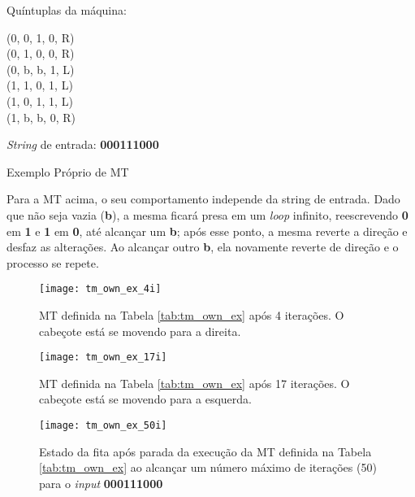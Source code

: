 \begin{table}[H]
    \begin{minipage}{0.6\linewidth}

        \begin{minipage}{0.55\linewidth}
                Quíntuplas da máquina:
        \end{minipage}%
        \begin{minipage}{0.45\linewidth}
            \ttfamily
            (0, 0, 1, 0, R) \\
            (0, 1, 0, 0, R) \\
            (0, b, b, 1, L) \\
            (1, 1, 0, 1, L) \\
            (1, 0, 1, 1, L) \\
            (1, b, b, 0, R)
        \end{minipage}

    \end{minipage}%
    \begin{minipage}{0.4\linewidth}

        \begin{flushright}
            \textit{String} de entrada: \textbf{000111000}
        \end{flushright}

    \end{minipage}

    \caption{Exemplo Próprio de MT}
    \label{tab:tm_own_ex}
\end{table}

\noindent
Para a MT acima, o seu comportamento independe da string de entrada. Dado que
não seja vazia (\textbf{b}), a mesma ficará presa em um \textit{loop} infinito,
reescrevendo \textbf{0} em \textbf{1} e \textbf{1} em \textbf{0}, até alcançar
um \textbf{b}; após esse ponto, a mesma reverte a direção e desfaz as
alterações. Ao alcançar outro \textbf{b}, ela novamente reverte de direção e
o processo se repete.

\begin{figure}[H]
    \centering
    \texttt{[image: tm\_own\_ex\_4i]}
    \caption{
        MT definida na Tabela \ref{tab:tm_own_ex} após 4 iterações. O cabeçote
        está se movendo para a direita.
    }
    \label{fig:tm_own_ex_4i}
\end{figure}

\begin{figure}[H]
    \centering
    \texttt{[image: tm\_own\_ex\_17i]}
    \caption{
        MT definida na Tabela \ref{tab:tm_own_ex} após 17 iterações. O cabeçote
        está se movendo para a esquerda.
    }
    \label{fig:tm_own_ex_17i}
\end{figure}

\begin{figure}[H]
    \centering
    \texttt{[image: tm\_own\_ex\_50i]}
    \caption{
        Estado da fita após parada da execução da MT definida na
        Tabela \ref{tab:tm_own_ex} ao alcançar um número máximo de iterações
        (50) para o \textit{input} \textbf{000111000}
    }
    \label{fig:tm_own_ex_50i}
\end{figure}